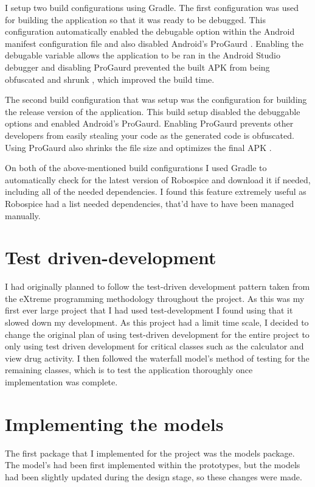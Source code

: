 I setup two build configurations using Gradle. The first configuration was used for building the application so that it was ready to be debugged. This configuration automatically enabled the debugable option within the Android manifest configuration file and also disabled Android's ProGaurd \cite{progaurd}. Enabling the debugable variable allows the application to be ran in the Android Studio debugger and disabling ProGaurd prevented the built APK from being obfuscated and shrunk \cite{progaurd}, which improved the build time. 

The second build configuration that was setup was the configuration for building the release version of the application. This build setup disabled the debuggable options and enabled Android's ProGaurd. Enabling ProGaurd prevents other developers from easily stealing your code as the generated code is obfuscated. Using ProGaurd also shrinks the file size and optimizes the final APK \cite{progaurd}.

On both of the above-mentioned build configurations I used Gradle to automatically check for the latest version of Robospice and download it if needed, including all of the needed dependencies. I found this feature extremely useful as Robospice had a list needed dependencies, that'd have to have been managed manually. 

\section{Test driven-development}

I had originally planned to follow the test-driven development pattern \cite{tdd} taken from the eXtreme programming \cite{xp} methodology throughout the project. As this was my first ever large project that I had used test-development I found using that it slowed down my development. As this project had a limit time scale, I decided to change the original plan of using test-driven development for the entire project to only using test driven development for critical classes such as the calculator and view drug activity. I then followed the waterfall model's method of testing for the remaining classes, which is to test the application thoroughly once implementation was complete.

\section{Implementing the models}

The first package that I implemented for the project was the models package. The model's had been first implemented within the prototypes, but the models had been slightly updated during the design stage, so these changes were made.

